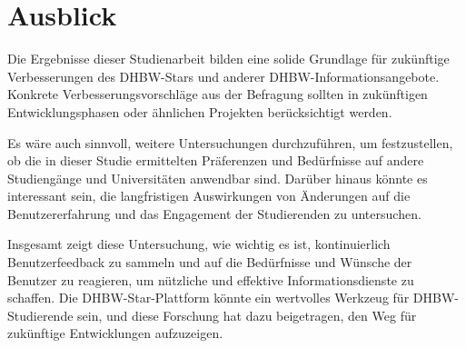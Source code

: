 \section{Ausblick}
Die Ergebnisse dieser Studienarbeit bilden eine solide Grundlage für zukünftige Verbesserungen des DHBW-Stars und anderer DHBW-Informationsangebote. Konkrete Verbesserungsvorschläge aus der Befragung sollten in zukünftigen Entwicklungsphasen oder ähnlichen Projekten berücksichtigt werden.

Es wäre auch sinnvoll, weitere Untersuchungen durchzuführen, um festzustellen, ob die in dieser Studie ermittelten Präferenzen und Bedürfnisse auf andere Studiengänge und Universitäten anwendbar sind. Darüber hinaus könnte es interessant sein, die langfristigen Auswirkungen von Änderungen auf die Benutzererfahrung und das Engagement der Studierenden zu untersuchen.

Insgesamt zeigt diese Untersuchung, wie wichtig es ist, kontinuierlich Benutzerfeedback zu sammeln und auf die Bedürfnisse und Wünsche der Benutzer zu reagieren, um nützliche und effektive Informationsdienste zu schaffen. Die DHBW-Star-Plattform könnte ein wertvolles Werkzeug für DHBW-Studierende sein, und diese Forschung hat dazu beigetragen, den Weg für zukünftige Entwicklungen aufzuzeigen.